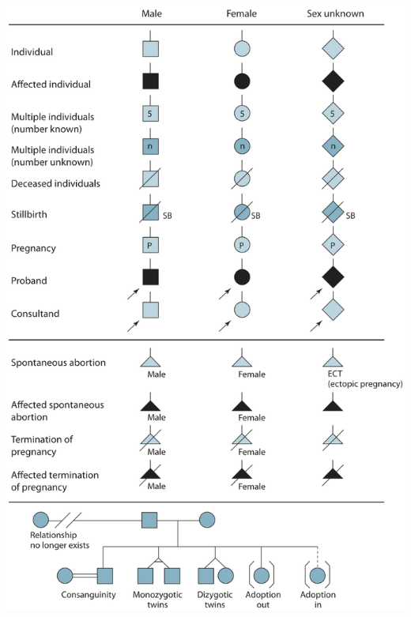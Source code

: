 \documentclass{inVerba-notes}
\begin{document}
\begin{center}
  
  \includegraphics[scale=0.35]{images/pedigree.png}
\end{center}
\end{document}
